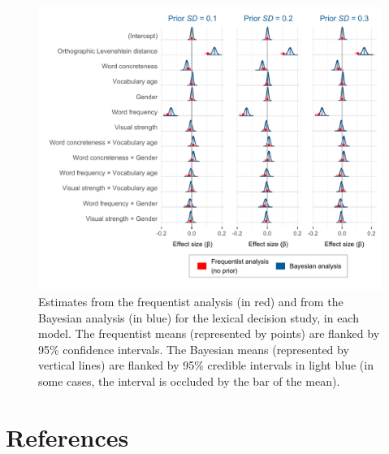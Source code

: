 \documentclass[
  12pt,
  man,floatsintext]{apa7}
\begin{document}
\begin{figure}

{\centering \includegraphics[width=1\linewidth]{../lexicaldecision/frequentist_bayesian_plots/plots/lexicaldecision_frequentist_bayesian_plot_allpriors_exgaussian} 

}

\caption{Estimates from the frequentist analysis (in red) and from the Bayesian analysis (in blue) for the lexical decision study, in each model. The frequentist means (represented by points) are flanked by 95\% confidence intervals. The Bayesian means (represented by vertical lines) are flanked by 95\% credible intervals in light blue (in some cases, the interval is occluded by the bar of the mean).}\label{fig:lexicaldecision-frequentist-bayesian-plot-allpriors-exgaussian}
\end{figure}

\clearpage

\hypertarget{references}{%
\section{References}\label{references}}
\end{document}
